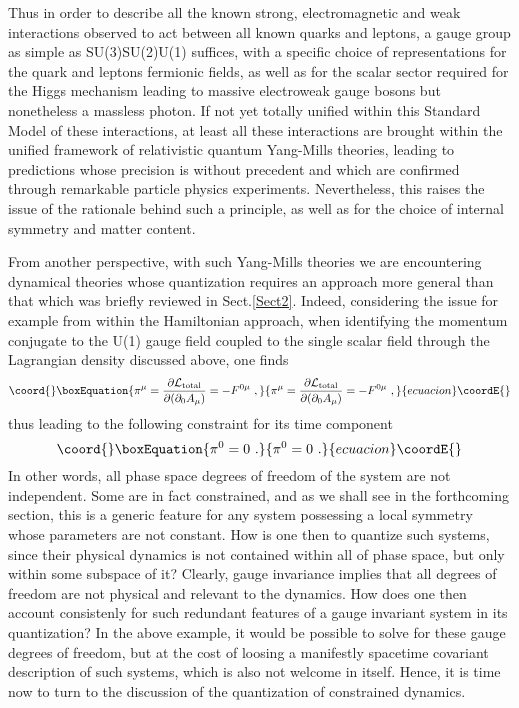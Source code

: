 \documentclass[a4paper,11pt]{article}
\begin{document}
Thus in order to describe all the known strong, electromagnetic and weak
interactions observed to act between all known quarks and leptons,
a gauge group as simple as SU(3)\coordHE{}SU(2)\coordHE{}U(1)\coordHE{}
suffices, with a specific choice of representations for the quark
and leptons fermionic fields, as well as for the scalar sector
required for the Higgs mechanism leading to massive electroweak gauge
bosons but nonetheless a massless photon. If not yet totally unified
within this Standard Model of these interactions, at least all these
interactions are brought within the unified framework of relativistic
quantum Yang-Mills theories, leading to predictions whose precision is
without precedent and which are confirmed through remarkable particle
physics experiments. Nevertheless, this raises the issue of the
rationale behind such a principle, as well as for the choice of internal
symmetry and matter content.

From another perspective, with such Yang-Mills theories we are encountering
dynamical theories whose quantization requires an approach more ge\-ne\-ral
than that which was briefly reviewed in Sect.\ref{Sect2}. Indeed,
considering the issue for example from within the Hamiltonian approach,
when identifying the momentum conjugate to the U(1) gauge field \coordHE{}
coupled to the single scalar field through the Lagrangian density discussed 
above, one finds
\begin{equation}\coord{}\boxEquation{
\pi^\mu=\frac{\partial{\cal L}_{\rm total}}{\partial(\partial_0A_\mu)}=
-F^{0\mu}\ ,
}{
\pi^\mu=\frac{\partial{\cal L}_{\rm total}}{\partial(\partial_0A_\mu)}=
-F^{0\mu}\ ,
}{ecuacion}\coordE{}\end{equation}
thus leading to the following constraint for its time component
\begin{equation}\coord{}\boxEquation{
\pi^0=0\ .
}{
\pi^0=0\ .
}{ecuacion}\coordE{}\end{equation}
In other words, all phase space degrees of freedom of the system are
not independent. Some are in fact constrained, and as we
shall see in the forthcoming section, this is a generic feature for
any system possessing a local symmetry whose parameters are not constant.
How is one then to quantize such systems, since their physical dynamics
is not contained within all of phase space, but only within some subspace
of it? Clearly, gauge invariance implies that all degrees of freedom are
not physical and relevant to the dynamics. How does one then account
consistenly for such redundant features of a gauge invariant system
in its quantization? In the above example, it would be possible to
solve for these gauge degrees of freedom, but at the cost of loosing
a manifestly spacetime covariant description of such systems, which is
also not welcome in itself. Hence, it is time now to turn to the
discussion of the quantization of constrained dynamics.
\end{document}
